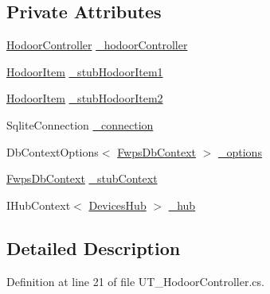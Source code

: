 \subsection*{Private Attributes}
\begin{DoxyCompactItemize}
\item 
\mbox{\hyperlink{class_f_w_p_s_1_1_controllers_1_1_hodoor_controller}{Hodoor\+Controller}} \mbox{\hyperlink{class_web_api_1_1_unit_1_1_test_1_1_controller_tests_1_1_u_t___hodoor_controller_abb5618edebadfaa42815d49d5bf77daa}{\+\_\+hodoor\+Controller}}
\item 
\mbox{\hyperlink{class_f_w_p_s_1_1_models_1_1_hodoor_item}{Hodoor\+Item}} \mbox{\hyperlink{class_web_api_1_1_unit_1_1_test_1_1_controller_tests_1_1_u_t___hodoor_controller_a3d14a3f8d62242e12a3640f2d259a46c}{\+\_\+stub\+Hodoor\+Item1}}
\item 
\mbox{\hyperlink{class_f_w_p_s_1_1_models_1_1_hodoor_item}{Hodoor\+Item}} \mbox{\hyperlink{class_web_api_1_1_unit_1_1_test_1_1_controller_tests_1_1_u_t___hodoor_controller_a7b86864c677cabca944ea507d4847829}{\+\_\+stub\+Hodoor\+Item2}}
\item 
Sqlite\+Connection \mbox{\hyperlink{class_web_api_1_1_unit_1_1_test_1_1_controller_tests_1_1_u_t___hodoor_controller_aeee049e26ff1143ba1b90ef654fcd405}{\+\_\+connection}}
\item 
Db\+Context\+Options$<$ \mbox{\hyperlink{class_f_w_p_s_1_1_data_1_1_fwps_db_context}{Fwps\+Db\+Context}} $>$ \mbox{\hyperlink{class_web_api_1_1_unit_1_1_test_1_1_controller_tests_1_1_u_t___hodoor_controller_abe659bf0d425968332534d46da1ae792}{\+\_\+options}}
\item 
\mbox{\hyperlink{class_f_w_p_s_1_1_data_1_1_fwps_db_context}{Fwps\+Db\+Context}} \mbox{\hyperlink{class_web_api_1_1_unit_1_1_test_1_1_controller_tests_1_1_u_t___hodoor_controller_a69daa8fe2240629179cd9ead6b87f2ef}{\+\_\+stub\+Context}}
\item 
I\+Hub\+Context$<$ \mbox{\hyperlink{class_f_w_p_s_1_1_devices_hub}{Devices\+Hub}} $>$ \mbox{\hyperlink{class_web_api_1_1_unit_1_1_test_1_1_controller_tests_1_1_u_t___hodoor_controller_a5c31a2ca2d23f4e0bf58597d576453a8}{\+\_\+hub}}
\end{DoxyCompactItemize}


\subsection{Detailed Description}


Definition at line 21 of file U\+T\+\_\+\+Hodoor\+Controller.\+cs.



